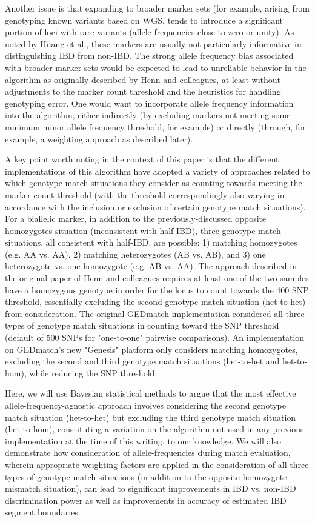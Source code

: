 \documentclass{article}
\begin{document}
Another issue is that expanding to broader marker sets (for example, arising from genotyping known variants based on WGS, tends to introduce a significant portion of loci with rare variants (allele frequencies close to zero or unity). As noted by Huang et al.,\citep{speeDB} these markers are usually not particularly informative in distinguishing IBD from non-IBD. The strong allele frequency bias associated with broader marker sets would be expected to lead to unreliable behavior in the algorithm as originally described by Henn and colleagues, at least without adjustments to the marker count threshold and the heuristics for handling genotyping error. One would want to incorporate allele frequency information into the algorithm, either indirectly (by excluding markers not meeting some minimum minor allele frequency threshold, for example) or directly (through, for example, a weighting approach as described later).

A key point worth noting in the context of this paper is that the different implementations of this algorithm have adopted a variety of approaches related to which genotype match situations they consider as counting towards meeting the marker count threshold (with the threshold correspondingly also varying in accordance with the inclusion or exclusion of certain genotype match situations). For a biallelic marker, in addition to the previously-discussed opposite homozygotes situation (inconsistent with half-IBD), three genotype match situations, all consistent with half-IBD, are possible: 1) matching homozygotes (e.g. AA vs. AA), 2) matching heterozygotes (AB vs. AB), and 3) one heterozygote vs. one homozygote (e.g. AB vs. AA). The approach described in the original paper of Henn and colleagues requires at least one of the two samples have a homozygous genotype in order for the locus to count towards the 400 SNP threshold, essentially excluding the second genotype match situation (het-to-het) from consideration. The original GEDmatch implementation considered all three types of genotype match situations in counting toward the SNP threshold (default of 500 SNPs for "one-to-one" pairwise comparisons). An implementation on GEDmatch's new "Genesis" platform only considers matching homozygotes, excluding the second and third genotype match situations (het-to-het and het-to-hom), while reducing the SNP threshold.

Here, we will use Bayesian statistical methods to argue that the most effective allele-frequency-agnostic approach involves considering the second genotype match situation (het-to-het) but excluding the third genotype match situation (het-to-hom), constituting a variation on the algorithm not used in any previous implementation at the time of this writing, to our knowledge. We will also demonstrate how consideration of allele-frequencies during match evaluation, wherein appropriate weighting factors are applied in the consideration of all three types of genotype match situations (in addition to the opposite homozygote mismatch situation), can lead to significant improvements in IBD vs. non-IBD discrimination power as well as improvements in accuracy of estimated IBD segment boundaries.
\end{document}
